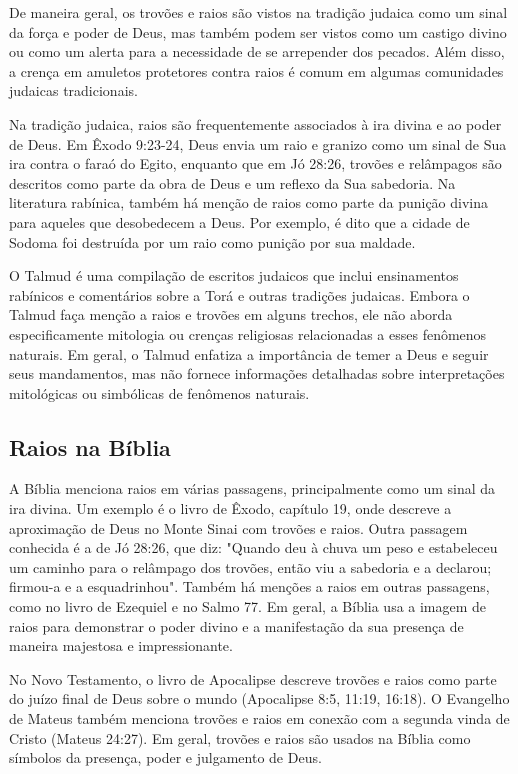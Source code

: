 \documentclass[a4paper, 12pt, onecolumn,singlespacing]{article}
\begin{document}
	De maneira geral, os trovões e raios são vistos na tradição judaica como um sinal da força e poder de Deus, mas também podem ser vistos como um castigo divino ou como um alerta para a necessidade de se arrepender dos pecados. Além disso, a crença em amuletos protetores contra raios é comum em algumas comunidades judaicas tradicionais.
	
	Na tradição judaica, raios são frequentemente associados à ira divina e ao poder de Deus. Em Êxodo 9:23-24, Deus envia um raio e granizo como um sinal de Sua ira contra o faraó do Egito, enquanto que em Jó 28:26, trovões e relâmpagos são descritos como parte da obra de Deus e um reflexo da Sua sabedoria. Na literatura rabínica, também há menção de raios como parte da punição divina para aqueles que desobedecem a Deus. Por exemplo, é dito que a cidade de Sodoma foi destruída por um raio como punição por sua maldade.
	
	O Talmud é uma compilação de escritos judaicos que inclui ensinamentos rabínicos e comentários sobre a Torá e outras tradições judaicas. Embora o Talmud faça menção a raios e trovões em alguns trechos, ele não aborda especificamente mitologia ou crenças religiosas relacionadas a esses fenômenos naturais. Em geral, o Talmud enfatiza a importância de temer a Deus e seguir seus mandamentos, mas não fornece informações detalhadas sobre interpretações mitológicas ou simbólicas de fenômenos naturais.
	
	\subsection{Raios na Bíblia}
	
	A Bíblia menciona raios em várias passagens, principalmente como um sinal da ira divina. Um exemplo é o livro de Êxodo, capítulo 19, onde descreve a aproximação de Deus no Monte Sinai com trovões e raios. Outra passagem conhecida é a de Jó 28:26, que diz: "Quando deu à chuva um peso e estabeleceu um caminho para o relâmpago dos trovões, então viu a sabedoria e a declarou; firmou-a e a esquadrinhou". Também há menções a raios em outras passagens, como no livro de Ezequiel e no Salmo 77. Em geral, a Bíblia usa a imagem de raios para demonstrar o poder divino e a manifestação da sua presença de maneira majestosa e impressionante.
	
	No Novo Testamento, o livro de Apocalipse descreve trovões e raios como parte do juízo final de Deus sobre o mundo (Apocalipse 8:5, 11:19, 16:18). O Evangelho de Mateus também menciona trovões e raios em conexão com a segunda vinda de Cristo (Mateus 24:27). Em geral, trovões e raios são usados na Bíblia como símbolos da presença, poder e julgamento de Deus.
	
\end{document}
